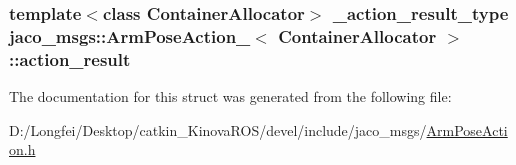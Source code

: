 \subsubsection[{\texorpdfstring{action\+\_\+result}{action_result}}]{\setlength{\rightskip}{0pt plus 5cm}template$<$class Container\+Allocator$>$ {\bf \+\_\+action\+\_\+result\+\_\+type} {\bf jaco\+\_\+msgs\+::\+Arm\+Pose\+Action\+\_\+}$<$ Container\+Allocator $>$\+::action\+\_\+result}\hypertarget{structjaco__msgs_1_1ArmPoseAction___a7ba6a9ad3ef5f285de5d80638173ccda}{}\label{structjaco__msgs_1_1ArmPoseAction___a7ba6a9ad3ef5f285de5d80638173ccda}


The documentation for this struct was generated from the following file\+:\begin{DoxyCompactItemize}
\item 
D\+:/\+Longfei/\+Desktop/catkin\+\_\+\+Kinova\+R\+O\+S/devel/include/jaco\+\_\+msgs/\hyperlink{ArmPoseAction_8h}{Arm\+Pose\+Action.\+h}\end{DoxyCompactItemize}
